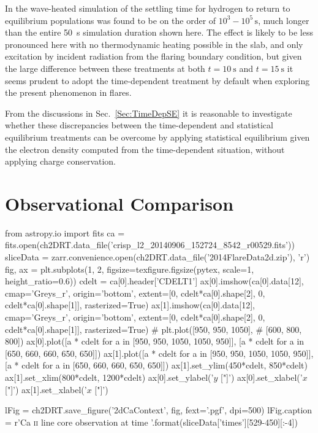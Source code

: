 In the wave-heated \Radyn{} simulation of \citet{Carlsson2002} the settling time for hydrogen to return to equilibrium populations was found to be on the order of $10^3-10^5\,\si{\second}$, much longer than the entire \SI{50}{\second} simulation duration shown here.
The effect is likely to be less pronounced here with no thermodynamic heating possible in the slab, and only excitation by incident radiation from the flaring boundary condition, but given the large difference between these treatments at both $t=\SI{10}{\second}$ and $t=\SI{15}{\second}$ it seems prudent to adopt the time-dependent treatment by default when exploring the present phenomenon in flares.

From the discussions in Sec.~\ref{Sec:TimeDepSE} it is reasonable to investigate whether these discrepancies between the time-dependent and statistical equilibrium treatments can be overcome by applying statistical equilibrium given the electron density computed from the time-dependent situation, without applying charge conservation.



\section{Observational Comparison}


\begin{pycode}[2DRT]
from astropy.io import fits
ca = fits.open(ch2DRT.data_file('crisp_l2_20140906_152724_8542_r00529.fits'))
sliceData = zarr.convenience.open(ch2DRT.data_file('2014FlareData2d.zip'), 'r')
fig, ax = plt.subplots(1, 2, figsize=texfigure.figsize(pytex, scale=1, height_ratio=0.6))
cdelt = ca[0].header['CDELT1']
ax[0].imshow(ca[0].data[12], cmap='Greys_r', origin='bottom', extent=[0, cdelt*ca[0].shape[2], 0, cdelt*ca[0].shape[1]], rasterized=True)
ax[1].imshow(ca[0].data[12], cmap='Greys_r', origin='bottom', extent=[0, cdelt*ca[0].shape[2], 0, cdelt*ca[0].shape[1]], rasterized=True)
# plt.plot([950, 950, 1050],
#     [600, 800, 800])
ax[0].plot([a * cdelt for a in [950, 950, 1050, 1050, 950]],
    [a * cdelt for a in [650, 660, 660, 650, 650]])
ax[1].plot([a * cdelt for a in [950, 950, 1050, 1050, 950]],
    [a * cdelt for a in [650, 660, 660, 650, 650]])
ax[1].set_ylim(450*cdelt, 850*cdelt)
ax[1].set_xlim(800*cdelt, 1200*cdelt)
ax[0].set_ylabel('$y$ ["]')
ax[0].set_xlabel('$x$ ["]')
ax[1].set_xlabel('$x$ ["]')

lFig = ch2DRT.save_figure('2dCaContext', fig, fext='.pgf', dpi=500)
lFig.caption = r'Ca \textsc{{ii}} line core observation at time {}'.format(sliceData['times'][529-450][:-4])
\end{pycode}

